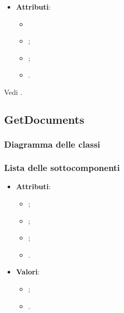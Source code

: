 \documentclass[10pt, a4paper]{article}
\begin{document}
\label{PostgresChatPreviewDettaglio}
\begin{itemize}
    \item \textbf{Attributi}:
    \begin{itemize}
        \item {}
        \item {};
        \item {};
        \item {}.
    \end{itemize}
\end{itemize}

Vedi .




\subsection{GetDocuments}
\subsubsection{Diagramma delle classi}
\subsubsection{Lista delle sottocomponenti}

\label{DocumentMetadataDettaglio}
\begin{itemize}
    \item \textbf{Attributi}:
    \begin{itemize}
        \item {};
        \item {};
        \item {};
        \item {}.
    \end{itemize}
\end{itemize}

\label{DocumentTypeDettaglio}
\begin{itemize}
    \item \textbf{Valori}:
    \begin{itemize}
        \item {};
        \item {}.
    \end{itemize}
\end{itemize}
\end{document}
